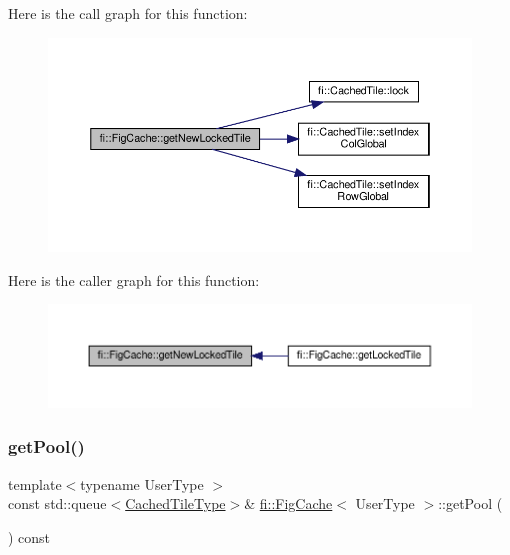 Here is the call graph for this function\+:
\nopagebreak
\begin{figure}[H]
\begin{center}
\leavevmode
\includegraphics[width=350pt]{d7/d31/classfi_1_1FigCache_a407bf89cbbc37af734bf31709d382920_cgraph}
\end{center}
\end{figure}
Here is the caller graph for this function\+:
\nopagebreak
\begin{figure}[H]
\begin{center}
\leavevmode
\includegraphics[width=350pt]{d7/d31/classfi_1_1FigCache_a407bf89cbbc37af734bf31709d382920_icgraph}
\end{center}
\end{figure}
\mbox{\label{classfi_1_1FigCache_a3248a10a2063e2e417203a2d1d8f1f5a}} 
\subsubsection{\texorpdfstring{get\+Pool()}{getPool()}}
{\footnotesize\ttfamily template$<$typename User\+Type $>$ \\
const std\+::queue$<$\hyperlink{classfi_1_1FigCache_a7b9bbc4a832c01c3a461f573445c3c41}{Cached\+Tile\+Type}$>$\& \hyperlink{classfi_1_1FigCache}{fi\+::\+Fig\+Cache}$<$ User\+Type $>$\+::get\+Pool (\begin{DoxyParamCaption}{ }\end{DoxyParamCaption}) const\hspace{0.3cm}{\ttfamily [inline]}}




